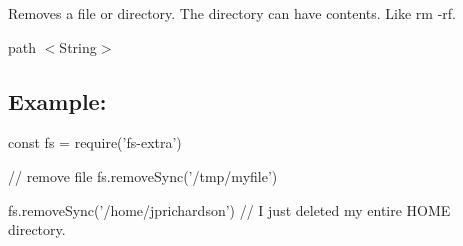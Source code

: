 Removes a file or directory. The directory can have contents. Like {\ttfamily rm -\/rf}.


\begin{DoxyItemize}
\item {\ttfamily path} {\ttfamily $<$String$>$}
\end{DoxyItemize}

\subsection*{Example\+:}


\begin{DoxyCode}
const fs = require('fs-extra')

// remove file
fs.removeSync('/tmp/myfile')

fs.removeSync('/home/jprichardson') // I just deleted my entire HOME directory.
\end{DoxyCode}
 